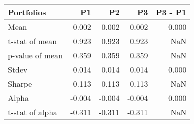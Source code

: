 \begin{tabular}{lrrrr}
\toprule
Portfolios & P1 & P2 & P3 & P3 - P1 \\
\midrule
Mean & 0.002 & 0.002 & 0.002 & 0.000 \\
t-stat of mean & 0.923 & 0.923 & 0.923 & NaN \\
p-value of mean & 0.359 & 0.359 & 0.359 & NaN \\
Stdev & 0.014 & 0.014 & 0.014 & 0.000 \\
Sharpe & 0.113 & 0.113 & 0.113 & NaN \\
Alpha & -0.004 & -0.004 & -0.004 & 0.000 \\
t-stat of alpha & -0.311 & -0.311 & -0.311 & NaN \\
\bottomrule
\end{tabular}

